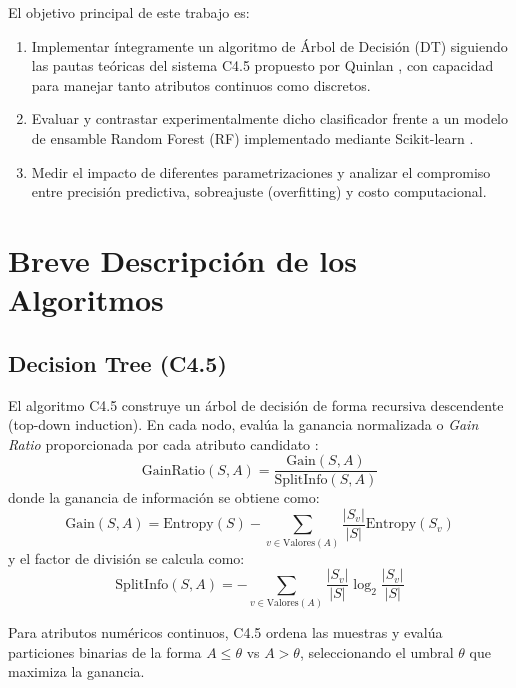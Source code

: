 \documentclass[runningheads]{llncs}
\begin{document}
El objetivo principal de este trabajo es:
\begin{enumerate}
    \item Implementar íntegramente un algoritmo de Árbol de Decisión (DT) siguiendo las pautas teóricas del sistema C4.5 propuesto por Quinlan \cite{quinlan1993c45}, con capacidad para manejar tanto atributos continuos como discretos.
    \item Evaluar y contrastar experimentalmente dicho clasificador frente a un modelo de ensamble Random Forest (RF) \cite{breiman2001random} implementado mediante Scikit-learn \cite{pedregosa2011scikit}.
    \item Medir el impacto de diferentes parametrizaciones y analizar el compromiso entre precisión predictiva, sobreajuste (overfitting) y costo computacional.
\end{enumerate}

\section{Breve Descripción de los Algoritmos}
\subsection{Decision Tree (C4.5)}
El algoritmo C4.5 construye un árbol de decisión de forma recursiva descendente (top-down induction). En cada nodo, evalúa la ganancia normalizada o \textit{Gain Ratio} proporcionada por cada atributo candidato \cite{liu2011web,quinlan1993c45}:
\begin{equation}
\text{GainRatio}(S, A) = \frac{\text{Gain}(S, A)}{\text{SplitInfo}(S, A)}
\end{equation}
donde la ganancia de información se obtiene como:
\begin{equation}
\text{Gain}(S, A) = \text{Entropy}(S) - \sum_{v \in \text{Valores}(A)} \frac{|S_v|}{|S|} \text{Entropy}(S_v)
\end{equation}
y el factor de división se calcula como:
\begin{equation}
\text{SplitInfo}(S, A) = - \sum_{v \in \text{Valores}(A)} \frac{|S_v|}{|S|} \log_2 \frac{|S_v|}{|S|}
\end{equation}

Para atributos numéricos continuos, C4.5 ordena las muestras y evalúa particiones binarias de la forma $A \leq \theta$ vs $A > \theta$, seleccionando el umbral $\theta$ que maximiza la ganancia.
\end{document}
